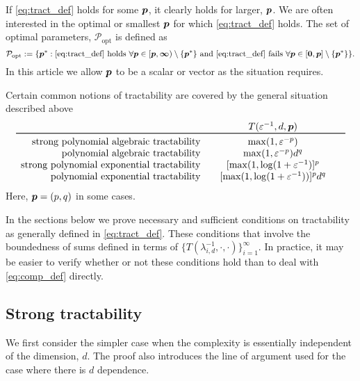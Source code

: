 \documentclass[11pt,a4paper]{article}
\begin{document}
If \eqref{eq:tract_def} holds for some $\boldsymbol{p}$, it clearly holds for larger, $\boldsymbol{p}$.  We are often interested in the optimal or smallest $\boldsymbol{p}$ for which \eqref{eq:tract_def} holds.
The  set of optimal parameters, $\mathcal{P}_{\text{opt}}$ is defined as
\begin{equation}
	\mathcal{P}_{\textup{opt}} : = \{\boldsymbol{p}^* : \eqref{eq:tract_def} \text{ holds }\forall \boldsymbol{p} \in [\boldsymbol{p},\boldsymbol{\infty}) \setminus \{\boldsymbol{p}^*\} \text{ and }
	\eqref{eq:tract_def} \text{ fails } \forall \boldsymbol{p} \in [\boldsymbol{0},\boldsymbol{p}] \setminus \{\boldsymbol{p}^*\} \}.
\end{equation}
In this article we allow $\boldsymbol{p}$ to be a scalar or vector as the situation requires.

Certain common notions of tractability are covered by the general situation described above
\begin{equation*}
	\begin{array}{r@{\qquad}c@{\qquad}c}
		& T(\varepsilon^{-1},d,\vp)\\
		\toprule
		\text{strong polynomial algebraic  tractability} & \max(1,\varepsilon^{-p})\\
		\text{polynomial algebraic tractability} & \max(1,\varepsilon^{-p})d^{q}\\
		\text{strong polynomial exponential tractability} &  [\max(1,\log(1 + \varepsilon^{-1})]^p\\
		\text{polynomial exponential tractability} &
		[\max(1,\log(1 + \varepsilon^{-1}))]^p  d^{q}
	\end{array}
\end{equation*}
Here, $\boldsymbol{p} = (p,q)$ in some cases.


In the sections below we prove necessary and sufficient conditions on tractability as generally defined in \eqref{eq:tract_def}.  These conditions  that involve the boundedness of sums defined in terms of $\{T(\lambda_{i,d}^{-1},\cdot, \cdot)\}_{i=1}^\infty$.  In practice, it may be easier to verify whether or not these conditions hold than to deal with \eqref{eq:comp_def} directly.


\subsection{Strong tractability}

We first consider the simpler case when the complexity is essentially independent of the dimension, $d$.  The proof also introduces the line of argument used for the case where there is $d$ dependence.
\end{document}
